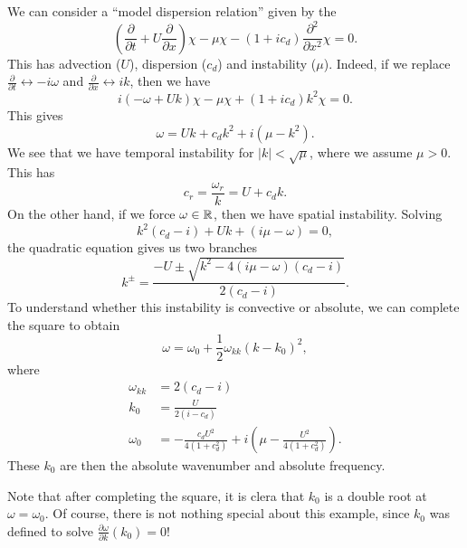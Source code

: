 \documentclass[a4paper]{article}
\begin{document}
%
%
\begin{eg}
  We can consider a ``model dispersion relation'' given by the 
  \[
    \left(\frac{\partial}{\partial t} + U \frac{\partial}{\partial x}\right) \chi - \mu \chi - (1 + i c_d) \frac{\partial^2}{\partial x^2}\chi = 0.
  \]
  This has advection ($U$), dispersion ($c_d$) and instability ($\mu$). Indeed, if we replace $\frac{\partial}{\partial t} \leftrightarrow -i\omega$ and $\frac{\partial}{\partial x} \leftrightarrow ik$, then we have
  \[
    i(-\omega + Uk)\chi - \mu \chi + (1 + ic_d) k^2 \chi = 0.
  \]
  This gives
  \[
    \omega = Uk + c_d k^2 + i(\mu - k^2).
  \]
  We see that we have temporal instability for $|k| < \sqrt{\mu}$, where we assume $\mu > 0$. This has
  \[
    c_r = \frac{\omega_r}{k} = U + c_d k.
  \]
  On the other hand, if we force $\omega \in \mathbb{R}$, then we have spatial instability. Solving
  \[
    k^2 (c_d - i) + Uk + (i\mu - \omega) = 0,
  \]
  the quadratic equation gives us two branches
  \[
    k^{\pm} = \frac{-U \pm \sqrt{k^2 - 4(i\mu - \omega)(c_d - i)}}{2(c_d - i)}.
  \]
  To understand whether this instability is convective or absolute, we can complete the square to obtain
  \[
    \omega = \omega_0 + \frac{1}{2} \omega_{kk}(k - k_0)^2,
  \]
  where
  \begin{align*}
    \omega_{kk} &= 2(c_d - i)\\
    k_0 &= \frac{U}{2(i - c_d)}\\
    \omega_0 &= -\frac{c_d U^2}{4(1 + c_d^2)} +i \left(\mu - \frac{U^2}{4(1 + c_d^2)}\right).
  \end{align*}
  These $k_0$ are then the absolute wavenumber and absolute frequency. %
\end{eg}

Note that after completing the square, it is clera that $k_0$ is a double root at $\omega = \omega_0$. Of course, there is not nothing special about this example, since $k_0$ was defined to solve $\frac{\partial \omega}{\partial k}(k_0) = 0$!
\end{document}

